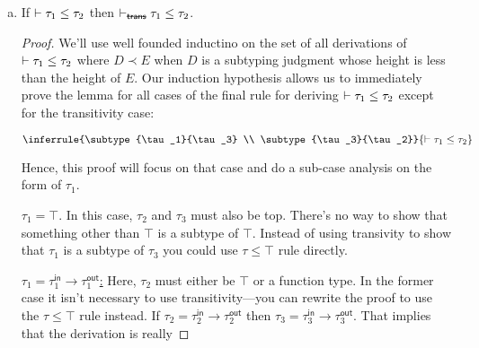 \begin{enumerate}[(a)]
\item
    \begin{lemma} If $\vdash \tau_1 \leq \tau_2$ then $\subtypeNoTrans{\tau_1}{\tau_2}$. \end{lemma}

    \begin{proof} We'll use well founded inductino on the set of all derivations of $\vdash \tau_1 \leq \tau_2$ where
    $D \prec E$ when $D$ is a subtyping judgment whose height is less than the height of $E$. Our induction hypothesis
    allows us to immediately prove the lemma for all cases of the final rule for deriving $\vdash \tau_1 \leq \tau_2$
    except for the transitivity case:

    $$\inferrule{\subtype{\tau_1}{\tau_3} \\ \subtype{\tau_3}{\tau_2}}{\subtype{\tau_1}{\tau_2}}$$

    Hence, this proof will focus on that case and do a sub-case analysis on the form of $\tau_1$.

    \underline{$\tau_1 = \top$}. In this case, $\tau_2$ and $\tau_3$ must also be top. There's no way to show that
    something other than $\top$ is a subtype of $\top$. Instead of using transivity to show that $\tau_1$ is a subtype
    of $\tau_3$ you could use $\tau \leq \top$ rule directly.

    \underline{$\tau_1 = \tau^\textsf{in}_1 \rightarrow \tau^\textsf{out}_1$:} Here, $\tau_2$ must either be $\top$ or
    a function type. In the former case it isn't necessary to use transitivity---you can rewrite the proof to use
    the $\tau \leq \top$ rule instead. If $\tau_2 = \tau^\textsf{in}_2 \rightarrow \tau^\textsf{out}_2$ then
    $\tau_3 = \tau^\textsf{in}_3 \rightarrow \tau^\textsf{out}_3$. That implies that the derivation is really

    \newcommand{\leftSubtree}{
        \inferrule{
            \subtype{\tau^\textsf{in}_3}{\tau^\textsf{in}_1} \\
            \subtype{\tau^\textsf{out}_1}{\tau^\textsf{out}_3}
        }{
            \subtype{\tau^\textsf{in}_1 \rightarrow \tau^\textsf{out}_1}{\tau^\textsf{in}_3 \rightarrow \tau^\textsf{out}_3}
        }
    }

    \newcommand{\rightSubtree}{
        \inferrule{
            \subtype{\tau^\textsf{in}_2}{\tau^\textsf{in}_3} \\
            \subtype{\tau^\textsf{out}_3}{\tau^\textsf{out}_2}
        }{
            \subtype{\tau^\textsf{in}_3 \rightarrow \tau^\textsf{out}_3}{\tau^\textsf{in}_2 \rightarrow \tau^\textsf{out}_2}
        }
    }


\end{proof}
\end{enumerate}
